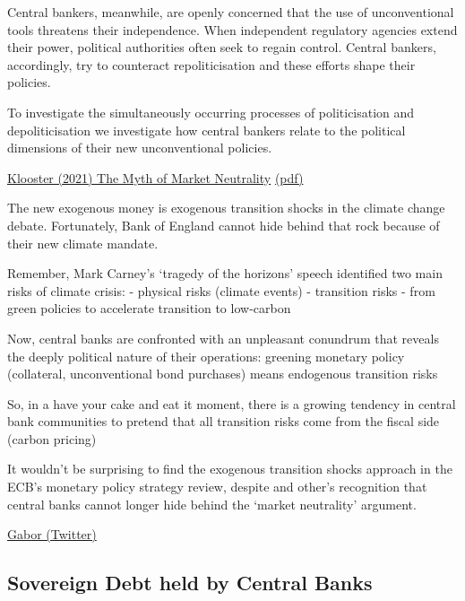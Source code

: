 \documentclass[
]{book}
\begin{document}
Central bankers, meanwhile, are openly concerned that the use of unconventional tools threatens
their independence.
When independent regulatory agencies extend their power, political authorities often seek to regain
control.
Central bankers, accordingly, try to counteract repoliticisation and these efforts
shape their policies.

To investigate the simultaneously occurring processes of politicisation and depoliticisation
we investigate how central bankers relate to the political dimensions of their
new unconventional policies.

\href{https://www.tandfonline.com/doi/epub/10.1080/13563467.2019.1657077?needAccess=true}{Klooster (2021) The Myth of Market Neutrality}
\href{pdf/Klooster_2021_Myth_of_Market_Neutrality.pdf}{(pdf)}

The new exogenous money is exogenous transition shocks in the climate change debate.
Fortunately, Bank of England cannot hide behind that rock because of their new climate mandate.

Remember, Mark Carney's `tragedy of the horizons' speech identified two main risks of climate crisis:
- physical risks (climate events)
- transition risks - from green policies to accelerate transition to low-carbon

Now, central banks are confronted with an unpleasant conundrum that reveals the deeply political nature of their operations:
greening monetary policy (collateral, unconventional bond purchases) means endogenous transition risks

So, in a have your cake and eat it moment, there is a growing tendency in central bank communities to pretend that all transition risks come from the fiscal side (carbon pricing)

It wouldn't be surprising to find the exogenous transition shocks approach in the ECB's monetary policy strategy review, despite \citet{Lagarde}
and other's recognition that central banks cannot longer hide behind the `market neutrality' argument.

\href{https://twitter.com/DanielaGabor/status/1384837864412917765}{Gabor (Twitter)}

\hypertarget{sovereign-debt-held-by-central-banks}{%
\subsection{Sovereign Debt held by Central Banks}\label{sovereign-debt-held-by-central-banks}}
\end{document}
